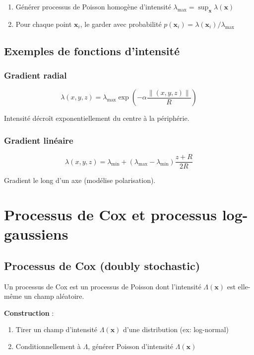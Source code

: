 \begin{enumerate}
    \item Générer processus de Poisson homogène d'intensité $\lambda_{\max} = \sup_{\mathbf{x}} \lambda(\mathbf{x})$
    \item Pour chaque point $\mathbf{x}_i$, le garder avec probabilité $p(\mathbf{x}_i) = \lambda(\mathbf{x}_i) / \lambda_{\max}$
\end{enumerate}

\subsection{Exemples de fonctions d'intensité}

\subsubsection{Gradient radial}

\[
\lambda(x, y, z) = \lambda_{\max} \exp\left(-\alpha \frac{\|(x,y,z)\|}{R}\right)
\]

Intensité décroît exponentiellement du centre à la périphérie.

\subsubsection{Gradient linéaire}

\[
\lambda(x, y, z) = \lambda_{\min} + (\lambda_{\max} - \lambda_{\min}) \frac{z + R}{2R}
\]

Gradient le long d'un axe (modélise polarisation).

\section{Processus de Cox et processus log-gaussiens}

\subsection{Processus de Cox (doubly stochastic)}

Un processus de Cox est un processus de Poisson dont l'intensité $\Lambda(\mathbf{x})$ est elle-même un champ aléatoire.

\textbf{Construction} :
\begin{enumerate}
    \item Tirer un champ d'intensité $\Lambda(\mathbf{x})$ d'une distribution (ex: log-normal)
    \item Conditionnellement à $\Lambda$, générer Poisson d'intensité $\Lambda(\mathbf{x})$
\end{enumerate}

